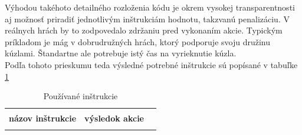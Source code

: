 Výhodou takéhoto detailného rozloženia kódu je okrem vysokej transparentnosti aj možnosť priradiť jednotlivým inštrukciám hodnotu, takzvanú penalizáciu. V reálnych hrách by to zodpovedalo zdržaniu pred vykonaním akcie. Typickým príkladom je mág v dobrudružných hrách, ktorý podporuje svoju družinu kúzlami. Štandartne ale potrebuje istý čas na vyrieknutie kúzla.\\
Podľa tohoto prieskumu teda výsledné potrebné inštrukcie sú popísané v tabuľke \ref{tab:instrukcie}
\begin{center}
\begin{longtable}{|l|l|l|}
\caption[Používané inštrukcie]{Používané inštrukcie}
\label{tab:instrukcie}\\
\hline \hline \\[-2ex]
\multicolumn{1}{c}{\textbf{názov inštrukcie}} &
\multicolumn{1}{c}{\textbf{výsledok akcie}} \\[0.5ex] \hline
\\[-1.8ex]
\endfirsthead


\end{longtable}
\end{center}
